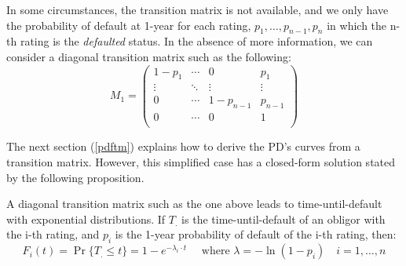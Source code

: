 \documentclass[11pt,fleqn]{book} %
\begin{document}
In some circumstances, the transition matrix is not available, and we only 
have the probability of default at 1-year for each rating, 
$p_1,\dots,p_{n-1},p_n$ in which the n-th rating is the \emph{defaulted} 
status. In the absence of more information, we can consider a diagonal 
transition matrix such as the following:
\begin{displaymath}
	M_1 = \left(
	\begin{array}{cccc}
		1-p_1  & \cdots & 0         & p_1     \\
		\vdots & \ddots & \vdots    & \vdots  \\
		0      & \cdots & 1-p_{n-1} & p_{n-1} \\
		0      & \cdots & 0         & 1       \\
	\end{array}
	\right)
\end{displaymath}

The next section (\ref{pdftm}) explains how to derive the PD's curves from a 
transition matrix. However, this simplified case has a closed-form solution 
stated by the following proposition.

\begin{proposition}
	\label{prop:pdfsv}
	A diagonal transition matrix such as the one above leads to 
	time-until-default with exponential distributions.
	If $T_.$ is the time-until-default of an obligor with the i-th rating,
	and $p_i$ is the 1-year probability of default of the i-th rating, then: 
	\begin{displaymath}
		F_i(t) = \Pr\{T_. \le t\} = 1 - e^{-\lambda_i \cdot t} 
		\quad \text{ where } \lambda = -\ln(1-p_i)
		\quad i=1,\dots,n
	\end{displaymath}
\end{proposition}
\end{document}
